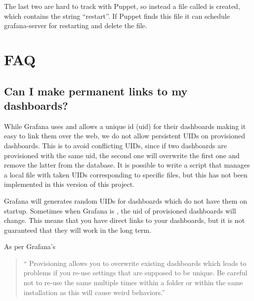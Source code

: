 \documentclass[letterpaper,10pt,english]{sphinxmanual}
\begin{document}
The last two are hard to track with Puppet, so instead a file called
 is created, which contains the string “restart”. If Puppet
finds this file it can schedule grafana-server for restarting and delete the
file.


\section{FAQ}
\label{\detokenize{readme:faq}}

\subsection{Can I make permanent links to my dashboards?}
\label{\detokenize{readme:can-i-make-permanent-links-to-my-dashboards}}
While Grafana uses and allows a unique id (uid) for their dashboards making it
easy to link them over the web, we do not allow persistent UIDs on provisioned
dashboards. This is to avoid conflicting UIDs, since if two dashboards are
provisioned with the same uid, the second one will overwrite the first one and
remove the latter from the database. It is possible to write a script that
manages a local file with taken UIDs corresponding to specific files, but this
has not been implemented in this version of this project.

Grafana will generates random UIDs for dashboards which do not have them on
startup. Sometimes when Grafana is {\hyperref[\detokenize{readme:restart}]{}}, the uid of
provisioned dashboards will change. This means that you  have direct links
to your dashboards, but it is not guaranteed that they will work in the long
term.

As per Grafana’s
\begin{quote}

“ Provisioning allows you to overwrite existing dashboards which
leads to problems if you re-use settings that are supposed to be unique. Be
careful not to re-use the same  multiple times within a folder or
 within the same installation as this will cause weird behaviors.”
\end{quote}
\end{document}

